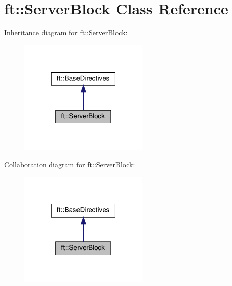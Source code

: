 \hypertarget{classft_1_1ServerBlock}{}\section{ft\+:\+:Server\+Block Class Reference}
\label{classft_1_1ServerBlock}


Inheritance diagram for ft\+:\+:Server\+Block\+:\nopagebreak
\begin{figure}[H]
\begin{center}
\leavevmode
\includegraphics[width=175pt]{classft_1_1ServerBlock__inherit__graph}
\end{center}
\end{figure}


Collaboration diagram for ft\+:\+:Server\+Block\+:\nopagebreak
\begin{figure}[H]
\begin{center}
\leavevmode
\includegraphics[width=175pt]{classft_1_1ServerBlock__coll__graph}
\end{center}
\end{figure}
